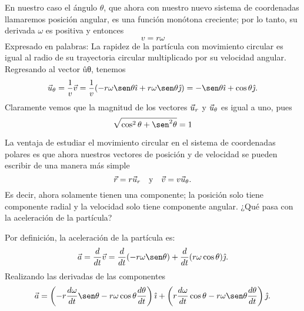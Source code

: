 En nuestro caso el ángulo $\theta$, que ahora con nuestro nuevo sistema de coordenadas llamaremos
posición angular, es una función monótona creciente; por lo tanto, su derivada $\omega$ es positiva y
entonces
$$v = r\omega$$
Expresado en palabras: La rapidez de la partícula con movimiento circular es igual al radio de su trayectoria circular multiplicado por su velocidad angular. Regresando al vector ûθ, tenemos
$$\velou_\theta = \frac{1}{v}\veloi = \frac{1}{v}(-r\omega\sen\theta\veci + r\omega\sen\theta\vecj) = -\sen\theta\veci + \cos\theta\vecj.$$
Claramente vemos que la magnitud de los vectores $\vec{u}_r$ y $\vec{u}_\theta$ es igual a uno, pues
$$\sqrt{\cos^2\theta + \sen^2\theta} = 1$$

La ventaja de estudiar el movimiento circular en el sistema de coordenadas polares es que ahora nuestros vectores de posición y de velocidad se pueden escribir de una manera más simple
$$\vec{r} = r\vec{u}_r \quad \text{y} \quad \vec{v} = v\vec{u}_\theta.$$
Es decir, ahora solamente tienen una componente; la posición solo tiene componente radial y la velocidad solo tiene componente angular. ¿Qué pasa con la aceleración de la partícula?

Por definición, la aceleración de la partícula es:
$$\acei = \frac{d}{dt}\veloi = \frac{d}{dt}(-r\omega\sen\theta) + \frac{d}{dt}(r\omega\cos\theta)\vecj.$$
Realizando las derivadas de las componentes
$$\acei = \left(-r\frac{d\omega}{dt}\sen\theta - r\omega\cos\theta\frac{d\theta}{dt}\right)\veci + \left(r\frac{d\omega}{dt}\cos\theta - r\omega\sen\theta\frac{d\theta}{dt}\right)\vecj.$$

